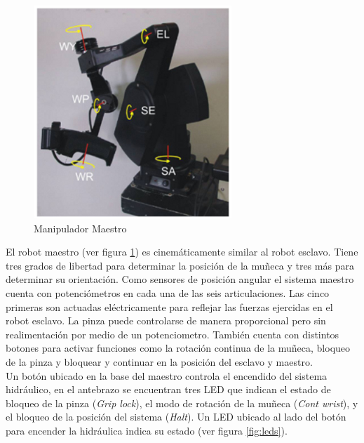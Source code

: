 \begin{figure}[htb!]
\centering
\includegraphics[scale=0.95]{FiguresP/Maestro}
\caption{Manipulador Maestro }
\label{fig:maestro}
\end{figure}

El robot maestro (ver figura \ref{fig:maestro}) es cinemáticamente similar al robot esclavo. Tiene tres grados de libertad para determinar la posición de la muñeca y tres m\'as para determinar su orientación. Como sensores de posición angular el sistema maestro cuenta con potenci\'ometros en cada una de las seis articulaciones. Las cinco primeras son actuadas eléctricamente para reflejar las fuerzas ejercidas en el robot esclavo. La pinza puede controlarse de manera proporcional pero sin realimentación por medio de un potenciometro. También cuenta con distintos botones para activar funciones como la rotación continua de la muñeca, bloqueo de la pinza y bloquear y continuar en la posición del esclavo y maestro.\\

Un botón ubicado en la base del maestro controla el encendido del sistema hidráulico, en el antebrazo  se encuentran tres LED que indican el estado de bloqueo de la pinza (\textit{Grip lock}), el modo de rotación de la muñeca (\textit{Cont wrist}), y el bloqueo de la posición del sistema (\textit{Halt}). Un LED ubicado al lado del botón para encender la hidráulica indica su estado (ver figura \ref{fig:leds}).



